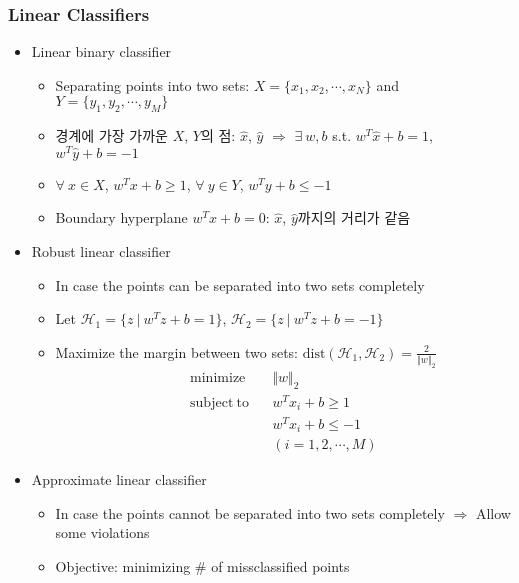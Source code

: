 \subsubsection*{Linear Classifiers}
\begin{itemize}
    \item Linear binary classifier
    \begin{itemize}
        \item Separating points into two sets: $X=\{x_1,x_2,\cdots,x_N\}$ and $Y=\{y_1,y_2,\cdots,y_M\}$
        \item 경계에 가장 가까운 $X$, $Y$의 점: $\hat{x}$, $\hat{y}$ $\Rightarrow$ $\exists~w,b$ s.t. $w^T\hat{x}+b=1$, $w^T\hat{y}+b=-1$
        \item $\forall~x\in X$, $w^Tx+b\geq1$, $\forall~y\in Y$, $w^Ty+b\leq-1$
        \item Boundary hyperplane $w^Tx+b=0$: $\hat{x}$, $\hat{y}$까지의 거리가 같음
    \end{itemize}
    \item Robust linear classifier
    \begin{itemize}
        \item In case the points can be separated into two sets completely
        \item Let $\mathcal{H}_1=\{z~|~w^Tz+b=1\}$, $\mathcal{H}_2=\{z~|~w^Tz+b=-1\}$
        \item Maximize the margin between two sets: $\mathrm{dist}(\mathcal{H}_1,\mathcal{H}_2)=\frac{2}{\Vert w\Vert_2}$
        \begin{equation}\begin{aligned}
            \mathrm{minimize}~~&~~\Vert w\Vert_2 \\
            \mathrm{subject~to}~~&~~w^Tx_i+b\geq1\\
                &~~w^Tx_i+b\leq-1\\
                &~~(i=1,2,\cdots,M)
        \end{aligned}\end{equation}
    \end{itemize}
    \clearpage
    \item Approximate linear classifier
    \begin{itemize}
        \item In case the points cannot be separated into two sets completely $\Rightarrow$ Allow some violations
        \item Objective: minimizing \# of missclassified points
        \begin{equation}\begin{aligned}

\end{aligned}
\end{equation}
\end{itemize}
\end{itemize}
